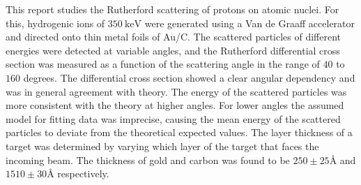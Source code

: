 This report studies the Rutherford scattering of protons on atomic
nuclei. For this, hydrogenic ions of $\SI{350}{\kilo\electronvolt}$ were
generated using
a Van de Graaff accelerator and directed onto thin metal foils of Au/C. The
scattered particles of different energies were detected at variable angles,
and the Rutherford differential cross section was measured as a function of
the scattering angle in the range of $40$ to $160$ degrees.
The differential cross section showed a clear angular dependency and was in
general agreement with theory. The energy of the scattered particles was more
consistent with the theory at higher angles. For lower angles the assumed model
for fitting data was
imprecise, causing the mean energy of the scattered particles to deviate from
the theoretical expected values.
The layer thickness of a target was determined by varying which layer of the
target that faces the incoming beam. The thickness of gold and carbon was found
to be $250\pm25\si{\angstrom}$ and $1510\pm30\si{\angstrom}$ respectively.



